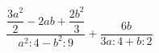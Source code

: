 \begin{ex}[type=expression]
	\begin{condition}
		\( \dfrac{\dfrac{3a^2}{2}-2ab+\dfrac{2b^2}{3}}{a^2:4-b^2:9}+\dfrac{6b}{3a:4+b:2} \)
	\end{condition}
\end{ex}